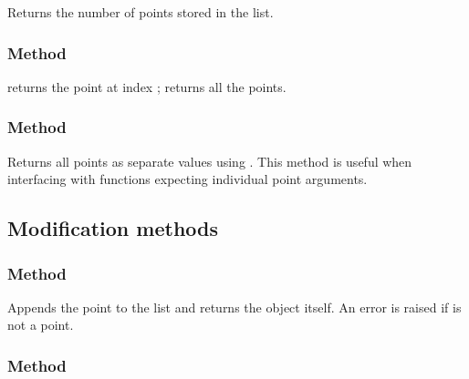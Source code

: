 Returns the number of points stored in the list.

\subsubsection{Method }
\label{ssub:meth_list_point_get}

 returns the point at index ;  returns all the points.

\subsubsection{Method }
\label{ssub:meth_list_point_unpack}

Returns all points as separate values using .
This method is useful when interfacing with functions expecting individual point arguments.

\begin{tkzexample}[latex=.5\textwidth]
\begin{center}
\end{center}
\end{tkzexample}

\subsection{Modification methods}
\label{subsec:list_point_mutators}

\subsubsection{Method }
\label{ssub:meth_list_point_add}

Appends the point  to the list and returns the object itself. An error is raised if  is not a point.

\subsubsection{Method }
\label{ssub:meth_list_point_extend}

